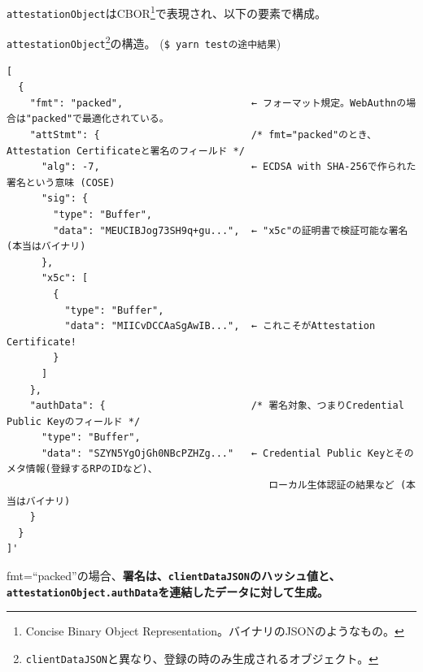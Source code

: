 \documentclass[12pt,dvipdfmx,uplatex]{beamer}
\begin{document}
\begin{frame}[fragile]
\small
\texttt{attestationObject}はCBOR\footnote[frame]{\tiny Concise Binary Object Representation。バイナリのJSONのようなもの。}で表現され、以下の要素で構成。

\vspace{-1ex}

\begin{exampleblock}{\footnotesize \texttt{attestationObject}\footnote[frame]{\tiny \texttt{clientDataJSON}と異なり、登録の時のみ生成されるオブジェクト。}の構造。 (\texttt{\$ yarn testの途中結果})}
{\tiny
\begin{verbatim}
[
  {
    "fmt": "packed",                      ← フォーマット規定。WebAuthnの場合は"packed"で最適化されている。
    "attStmt": {                          /* fmt="packed"のとき、Attestation Certificateと署名のフィールド */
      "alg": -7,                          ← ECDSA with SHA-256で作られた署名という意味 (COSE)
      "sig": {
        "type": "Buffer",
        "data": "MEUCIBJog73SH9q+gu...",  ← "x5c"の証明書で検証可能な署名 (本当はバイナリ)
      },
      "x5c": [
        {
          "type": "Buffer",
          "data": "MIICvDCCAaSgAwIB...",  ← これこそがAttestation Certificate!
        }
      ]
    },
    "authData": {                         /* 署名対象、つまりCredential Public Keyのフィールド */
      "type": "Buffer",
      "data": "SZYN5YgOjGh0NBcPZHZg..."   ← Credential Public Keyとそのメタ情報(登録するRPのIDなど)、
                                             ローカル生体認証の結果など (本当はバイナリ)
    }
  }
]'
\end{verbatim}
}
\end{exampleblock}
\vspace{-1ex}

{\footnotesize
fmt=``packed''の場合、\textbf{署名は、\texttt{clientDataJSON}のハッシュ値と、\texttt{attestationObject.authData}を連結したデータに対して生成。}}
\end{frame}
\end{document}
